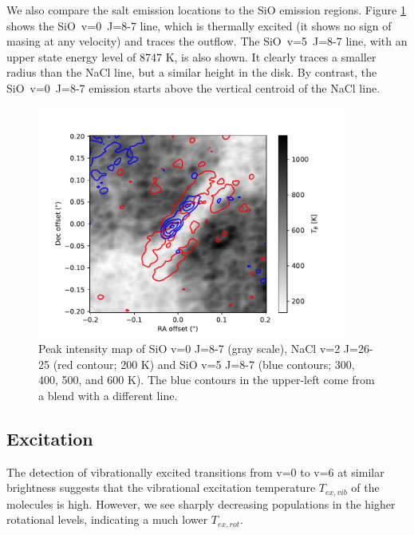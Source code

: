\documentclass[twocolumn]{aastex62}
\begin{document}
We also compare the salt emission locations to the SiO emission regions.
Figure \ref{fig:sioonnacl} shows the \mbox{SiO v=0 J=8-7} line, which is
thermally excited (it shows no sign of masing at any velocity) and traces the
outflow.  The \mbox{SiO v=5 J=8-7} line, with an upper state energy level of
8747 K, is also shown.  It clearly traces a smaller radius than the NaCl line,
but a similar height in the disk.  By contrast, the \mbox{SiO v=0 J=8-7}
emission starts above the vertical centroid of the NaCl line.


\begin{figure}[!htp]
\includegraphics[scale=1,width=4in]{figures/SiO_8-7_on_NaClv=2_26-25.pdf}
\caption{Peak intensity map of SiO v=0 J=8-7 (gray scale), NaCl v=2 J=26-25
(red contour; 200 K) and {SiO v=5 J=8-7} (blue contours; 300, 400, 500, and 600
K).  The blue contours in the upper-left come from a blend with a different
line.
}
\label{fig:sioonnacl}
\end{figure}



\subsection{Excitation}
The detection of vibrationally excited transitions from v=0 to v=6 at similar
brightness suggests that the vibrational excitation temperature $T_{ex,vib}$ of
the molecules is high.  However, we see sharply decreasing populations in
the higher rotational levels, indicating a much lower $T_{ex,rot}$.
\end{document}
